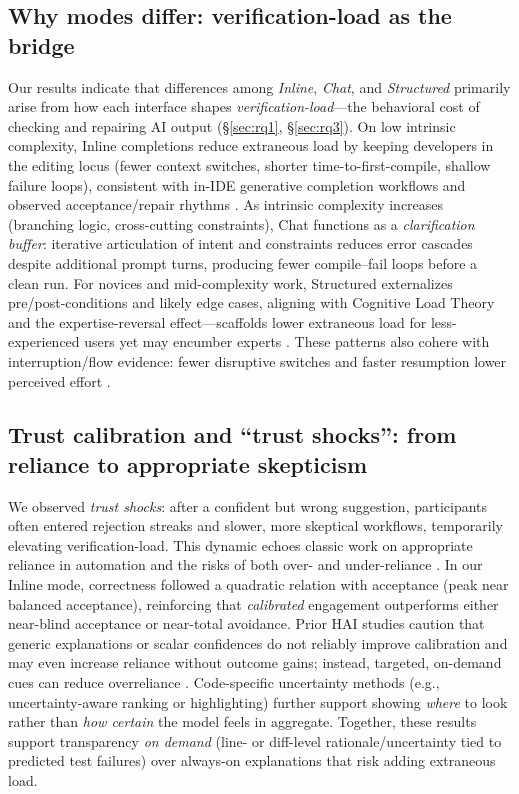 \documentclass[sigconf]{acmart}
\begin{document}
\subsection{Why modes differ: verification-load as the bridge}
Our results indicate that differences among \emph{Inline}, \emph{Chat}, and \emph{Structured} primarily arise from how each interface shapes \emph{verification-load}---the behavioral cost of checking and repairing AI output (\S\ref{sec:rq1}, \S\ref{sec:rq3}). On low intrinsic complexity, Inline completions reduce extraneous load by keeping developers in the editing locus (fewer context switches, shorter time-to-first-compile, shallow failure loops), consistent with in-IDE generative completion workflows and observed acceptance/repair rhythms \cite{svyatkovskiy2020intellicode,barke2023groundedcopilot}. As intrinsic complexity increases (branching logic, cross-cutting constraints), Chat functions as a \emph{clarification buffer}: iterative articulation of intent and constraints reduces error cascades despite additional prompt turns, producing fewer compile--fail loops before a clean run. For novices and mid-complexity work, Structured externalizes pre/post-conditions and likely edge cases, aligning with Cognitive Load Theory and the expertise-reversal effect---scaffolds lower extraneous load for less-experienced users yet may encumber experts \cite{kalyuga2007expertise,sweller2019cognitive}. These patterns also cohere with interruption/flow evidence: fewer disruptive switches and faster resumption lower perceived effort \cite{mark2008cost}.

\subsection{Trust calibration and ``trust shocks'': from reliance to appropriate skepticism}
We observed \emph{trust shocks}: after a confident but wrong suggestion, participants often entered rejection streaks and slower, more skeptical workflows, temporarily elevating verification-load. This dynamic echoes classic work on appropriate reliance in automation and the risks of both over- and under-reliance \cite{lee2004trust,parasuraman1997humans}. In our Inline mode, correctness followed a quadratic relation with acceptance (peak near balanced acceptance), reinforcing that \emph{calibrated} engagement outperforms either near-blind acceptance or near-total avoidance. Prior HAI studies caution that generic explanations or scalar confidences do not reliably improve calibration and may even increase reliance without outcome gains; instead, targeted, on-demand cues can reduce overreliance \cite{yin2019understanding,vasconcelos2025generation}. Code-specific uncertainty methods (e.g., uncertainty-aware ranking or highlighting) further support showing \emph{where} to look rather than \emph{how certain} the model feels in aggregate. Together, these results support transparency \emph{on demand} (line- or diff-level rationale/uncertainty tied to predicted test failures) over always-on explanations that risk adding extraneous load.
\end{document}
